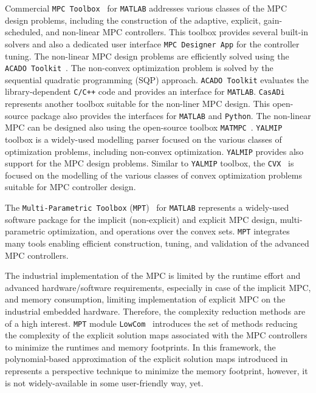 \documentclass[letterpaper, 10 pt, conference]{ieeeconf}
\begin{document}
Commercial \texttt{MPC Toolbox}~\cite{MPC_toolbox} for \texttt{MATLAB} addresses various classes of the MPC design problems, including the construction of the adaptive, explicit, gain-scheduled, and non-linear MPC controllers. This toolbox provides several built-in solvers and also a dedicated user interface \texttt{MPC Designer App} for the controller tuning. 
%
The non-linear MPC design problems are efficiently solved using the \texttt{ACADO Toolkit}~\cite{ACADO_Toolkit}. The non-convex optimization problem is solved by the sequential quadratic programming (SQP) approach.  \texttt{ACADO Toolkit} evaluates the library-dependent \texttt{C/C++} code and provides an interface for \texttt{MATLAB}. 
%
\texttt{CasADi}~\cite{CasADi} represents another toolbox suitable for the non-liner MPC design. This open-source package also provides the interfaces for \texttt{MATLAB} and \texttt{Python}. 
%
The non-linear MPC can be designed also using the open-source toolbox \texttt{MATMPC}~\cite{MATMPC}. 
%
\texttt{YALMIP}~\cite{L04} toolbox is a widely-used modelling parser focused on the various classes of optimization problems, including non-convex optimization. \texttt{YALMIP} provides also support for the MPC design problems. 
%
Similar to \texttt{YALMIP} toolbox, the \texttt{CVX}~\cite{GB08} is focused on the modelling of the various classes of convex optimization problems suitable for MPC controller design. 

The \texttt{Multi-Parametric Toolbox} (\texttt{MPT})~\cite{MPT3} for \texttt{MATLAB} represents a widely-used software package for the implicit (non-explicit) and explicit MPC design, multi-parametric optimization, and operations over the convex sets. \texttt{MPT} integrates many tools enabling efficient construction, tuning, and validation of the advanced MPC controllers. 

The industrial implementation of the MPC is limited by the runtime effort and advanced hardware/software requirements, especially in case of the implicit MPC, and memory consumption, limiting implementation of explicit MPC on the industrial embedded hardware. Therefore, the complexity reduction methods are of a high interest. 
\texttt{MPT} module \texttt{LowCom}~\cite{KH15} introduces the set of methods reducing the complexity of the explicit solution maps associated with the MPC controllers to minimize the runtimes and memory footprints. 
In this framework, the polynomial-based approximation of the explicit solution maps introduced in~\cite{KL11} represents a perspective technique to minimize the memory footprint, however, it is not widely-available in some user-friendly way, yet.
\end{document}
